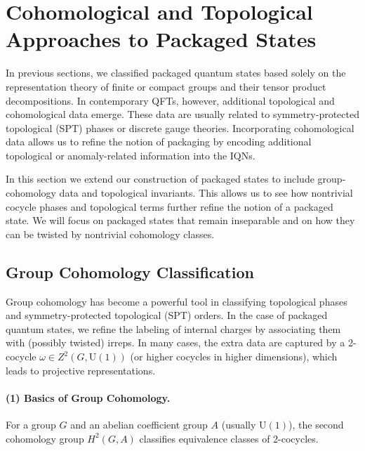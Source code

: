 \documentclass[12pt,a4paper]{article}
\begin{document}
\section{Cohomological and Topological Approaches to Packaged States}
\label{SEC:CohomologicalAndTopologicalApproachesToPackagedStates}


In previous sections, we classified packaged quantum states based solely on the representation theory of finite or compact groups and their tensor product decompositions.
In contemporary QFTs, however, additional topological \cite{DijkgraafWitten1990,DeserJackiwTempleton1982,WessZumino1971,Witten1983,AlvarezGaumeGinsparg1985,Witten1989,Atiyah1989} and cohomological \cite{DijkgraafWitten1990,Chen2011,Chen2012} data emerge.
These data are usually related to symmetry-protected topological (SPT) phases or discrete gauge theories.
Incorporating cohomological data allows us to refine the notion of packaging by encoding additional topological or anomaly-related information into the IQNs.


In this section we extend our construction of packaged states to include group‐cohomology data and topological invariants.
This allows us to see how nontrivial cocycle phases and topological terms further refine the notion of a packaged state.
We will focus on packaged states that remain inseparable and on how they can be twisted by nontrivial cohomology classes.



\subsection{Group Cohomology Classification}

Group cohomology has become a powerful tool in classifying topological phases and symmetry-protected topological (SPT) orders.\cite{Chen2011,Chen2012}
In the case of packaged quantum states, we refine the labeling of internal charges by associating them with (possibly twisted) irreps.
In many cases, the extra data are captured by a 2-cocycle $\omega \in Z^2(G, \mathrm{U}(1))$ (or higher cocycles in higher dimensions), which leads to projective representations.


\paragraph{(1) Basics of Group Cohomology.}
For a group $G$ and an abelian coefficient group $A$ (usually $\mathrm{U}(1)$), the second cohomology group $H^2(G, A)$ classifies equivalence classes of 2-cocycles.
\end{document}
